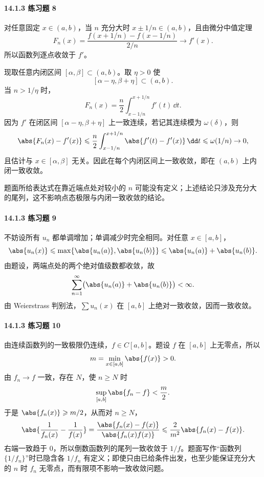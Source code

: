 \paragraph{14.1.3 练习题 8}
\begin{xsolution}
对任意固定 $x\in(a,b)$，当 $n$ 充分大时 $x\pm1/n\in(a,b)$，且由微分中值定理
\[
  F_n(x)
  =\frac{f(x+1/n)-f(x-1/n)}{2/n}\to f'(x).
\]
所以函数列逐点收敛于 $f'$。

现取任意内闭区间 $[\alpha,\beta]\subset(a,b)$。取 $\eta>0$ 使
\[
  [\alpha-\eta,\beta+\eta]\subset(a,b).
\]
当 $n>1/\eta$ 时，
\[
  F_n(x)=\frac n2\int_{x-1/n}^{x+1/n}f'(t)\,\dd t.
\]
因为 $f'$ 在闭区间 $[\alpha-\eta,\beta+\eta]$ 上一致连续，若记其连续模为 $\omega(\delta)$，则
\[
  \abs{F_n(x)-f'(x)}
  \leqslant\frac n2\int_{x-1/n}^{x+1/n}\abs{f'(t)-f'(x)}\,\dd t
  \leqslant\omega(1/n)\to0,
\]
且估计与 $x\in[\alpha,\beta]$ 无关。因此在每个内闭区间上一致收敛，即在 $(a,b)$ 上内闭一致收敛。

题面所给表达式在靠近端点处对较小的 $n$ 可能没有定义；上述结论只涉及充分大的尾列，这不影响点态极限与内闭一致收敛的结论。
\end{xsolution}

\paragraph{14.1.3 练习题 9}
\begin{xsolution}
不妨设所有 $u_n$ 都单调增加；单调减少时完全相同。对任意 $x\in[a,b]$，
\[
  \abs{u_n(x)}\leqslant\max\{\abs{u_n(a)},\abs{u_n(b)}\}
  \leqslant\abs{u_n(a)}+\abs{u_n(b)}.
\]
由题设，两端点处的两个绝对值级数都收敛，故
\[
  \sum_{n=1}^{\infty}\bigl(\abs{u_n(a)}+\abs{u_n(b)}\bigr)<\infty.
\]
由 Weierstrass 判别法，$\sum u_n(x)$ 在 $[a,b]$ 上绝对一致收敛，因而一致收敛。
\end{xsolution}

\paragraph{14.1.3 练习题 10}
\begin{xsolution}
由连续函数列的一致极限仍连续，$f\in C[a,b]$。题设 $f$ 在 $[a,b]$ 上无零点，所以
\[
  m=\min_{x\in[a,b]}\abs{f(x)}>0.
\]
由 $f_n\to f$ 一致，存在 $N$，使 $n\geqslant N$ 时
\[
  \sup_{[a,b]}\abs{f_n-f}<\frac m2.
\]
于是 $\abs{f_n(x)}\geqslant m/2$，从而对 $n\geqslant N$，
\[
  \abs{\frac1{f_n(x)}-\frac1{f(x)}}
  =\frac{\abs{f_n(x)-f(x)}}{\abs{f_n(x)f(x)}}
  \leqslant\frac2{m^2}\abs{f_n(x)-f(x)}.
\]
右端一致趋于 $0$，所以倒数函数列的尾列一致收敛于 $1/f$。题面写作“函数列 $\{1/f_n\}$”时已隐含各 $1/f_n$ 有定义；即使只由已给条件出发，也至少能保证充分大的 $n$ 时 $f_n$ 无零点，而有限项不影响一致收敛问题。
\end{xsolution}


